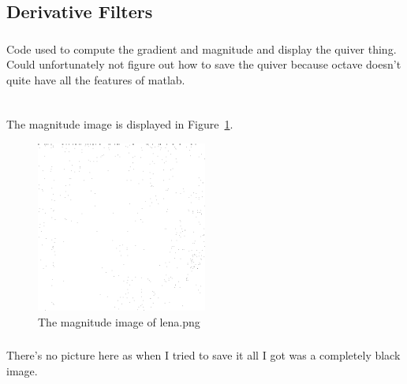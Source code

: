 \subsection{Derivative Filters}

\subsubsection{}
Code used to compute the gradient and magnitude and display the quiver thing.
Could unfortunately not figure out how to save the quiver because octave doesn't quite have all the features of matlab.
\inputminted[linenos=true]{octave}{../code/2.4.m}

\subsubsection{}
The magnitude image is displayed in Figure~\ref{fig:2-4-1}.

\begin{figure}[H]
    \centering
    \includegraphics[width=0.5\textwidth]{../code/2_out/2-4_mag.png}

    \caption{The magnitude image of lena.png}
    \label{fig:2-4-1}
\end{figure}

\subsubsection{}
There's no picture here as when I tried to save it all I got was a completely black image.
